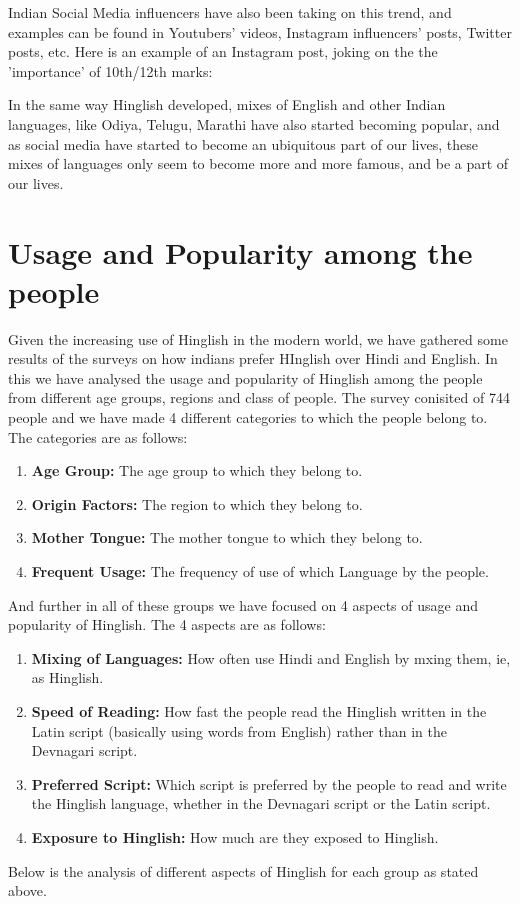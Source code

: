 \documentclass{article}
\begin{document}
Indian Social Media influencers have also been taking on this trend, and examples can be found in Youtubers' videos, Instagram influencers' posts, Twitter posts, etc. Here is an example of an Instagram post, joking on the the 'importance' of 10th/12th marks:

In the same way Hinglish developed, mixes of English and other Indian languages, like Odiya, Telugu, Marathi have also started becoming popular, and as social media have started to become an ubiquitous part of our lives, these mixes of languages only seem to become more and more famous, and be a part of our lives.


\section{Usage and Popularity among the people}
Given the increasing use of Hinglish in the modern world, we have gathered some results of the surveys on how indians prefer HInglish over Hindi and English. In this we have analysed the usage and popularity of Hinglish among the people from different age groups, regions and class of people. The survey conisited of 744 people and we have made 4 different categories to which the people belong to. The categories are as follows:
\begin{enumerate}
    \item \textbf{Age Group:} The age group to which they belong to.
    \item \textbf{Origin Factors:} The region to which they belong to.
    \item \textbf{Mother Tongue:} The mother tongue to which they belong to.
    \item \textbf{Frequent Usage:} The frequency of use of which Language by the people.
\end{enumerate}
And further in all of these groups we have focused on 4 aspects of usage and popularity of Hinglish. The 4 aspects are as follows:

\begin{enumerate}
    \item \textbf{Mixing of Languages:} How often use Hindi and English by mxing them, ie, as Hinglish.
    \item \textbf{Speed of Reading:} How fast the people read the Hinglish written in the Latin script (basically using words from English) rather than in the Devnagari script.
    \item \textbf{Preferred Script:} Which script is preferred by the people to read and write the Hinglish language, whether in the Devnagari script or the Latin script.
    \item \textbf{Exposure to Hinglish:} How much are they exposed to Hinglish.
\end{enumerate}
Below is the analysis of different aspects of Hinglish for each group as stated above.
\end{document}
